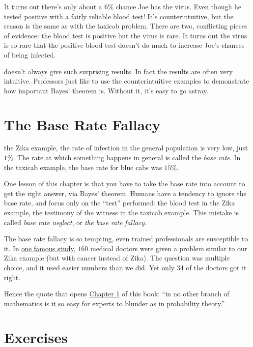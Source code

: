 \documentclass[justified]{tufte-book}
\theoremstyle{definition}
\theoremstyle{definition}
\theoremstyle{definition}
\theoremstyle{remark}
\begin{document}
It turns out there's only about a \(6\%\) chance Joe has the virus. Even
though he tested positive with a fairly reliable blood test! It's
counterintuitive, but the reason is the same as with the taxicab
problem. There are two, conflicting pieces of evidence: the blood test
is positive but the virus is rare. It turns out the virus is so rare
that the positive blood test doesn't do much to increase Joe's chances
of being infected.

 doesn't always give such surprising results.
In fact the results are often very intuitive. Professors just like to
use the counterintuitive examples to demonstrate how important Bayes'
theorem is. Without it, it's easy to go astray.

\hypertarget{baserate}{%
\section{The Base Rate Fallacy}\label{baserate}}

 the Zika example, the rate of infection in the general
population is very low, just \(1\%\). The rate at which something
happens in general is called the \emph{base rate}. In the taxicab
example, the base rate for blue cabs was \(15\%\).

One lesson of this chapter is that you have to take the base rate into
account to get the right answer, via Bayes' theorem. Humans have a
tendency to ignore the base rate, and focus only on the ``test''
performed: the blood test in the Zika example, the testimony of the
witness in the taxicab example. This mistake is called \emph{base rate
neglect}, or \emph{the base rate fallacy}.

The base rate fallacy is so tempting, even trained professionals are
susceptible to it. In
\href{https://www.stat.berkeley.edu/~aldous/157/Papers/health_stats.pdf}{one
famous study}, \(160\) medical doctors were given a problem similar to
our Zika example (but with cancer instead of Zika). The question was
multiple choice, and it used easier numbers than we did. Yet only \(34\)
of the doctors got it right.

Hence the quote that opens
\protect\hyperlink{the-monty-hall-problem}{Chapter 1} of this book: ``in
no other branch of mathematics is it so easy for experts to blunder as
in probability theory.''

\hypertarget{exercises-6}{%
\section*{Exercises}\label{exercises-6}}
\end{document}
